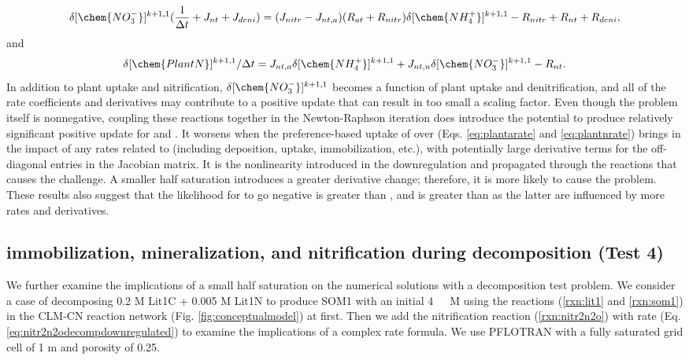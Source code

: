 \documentclass[gmd, manuscript]{copernicus}
\begin{document}
\begin{equation}
\delta [\chem{NO_3^-}]^{k+1,1} (\frac{1}{\Delta t} + J_{nt} + J_{deni}) =
(J_{nitr} - J_{nt,a})(R_{at} + R_{nitr}) \delta [\chem{NH_4^+}]^{k+1,1} -
R_{nitr} + R_{nt} + R_{deni},
\end{equation}
and
\begin{equation}
\delta [\chem{PlantN}]^{k+1,1}/\Delta t  = J_{nt,a} \delta
[\chem{NH_4^+}]^{k+1,1} + J_{nt,n} \delta [\chem{NO_3^-}]^{k+1,1} - R_{nt}. 
\end{equation}
In addition to plant  uptake and nitrification, $\delta
[\chem{NO_3^-}]^{k+1,1}$ becomes a function of plant  uptake and
denitrification, and all of the rate coefficients and derivatives may
contribute to a positive update that can result in too small a scaling factor.
Even though the problem itself is nonnegative, coupling these reactions
together in the Newton-Raphson iteration does introduce the potential to
produce relatively significant positive update for  and
. It worsens when the preference-based uptake of 
over  (Eqs. \ref{eq:plantarate} and \ref{eq:plantnrate}) brings
in the impact of any rates related to 
(including deposition, uptake, immobilization, etc.), with potentially large
derivative terms for the off-diagonal entries in the Jacobian matrix. It is the
nonlinearity introduced in the downregulation and propagated through the
reactions that causes the challenge. A smaller half saturation introduces a
greater derivative change; therefore, it is more likely to cause the problem.
These results also suggest that the likelihood for  to go negative
is greater than , and  is greater than  as
the latter are influenced by more rates and derivatives. 

\subsection{ immobilization, mineralization, and nitrification during decomposition (Test 4)}
We further examine the implications of a small half saturation on the numerical
solutions with a decomposition test problem. We consider a case of decomposing
0.2 M Lit1C + 0.005 M Lit1N to produce SOM1 with an initial 4 \unit{\mu\,M} 
using the reactions (\ref{rxn:lit1} and \ref{rxn:som1}) in the CLM-CN
reaction network (Fig. \ref{fig:conceptualmodel}) at first. Then we add the
nitrification reaction (\ref{rxn:nitr2n2o}) with rate
(Eq. \ref{eq:nitr2n2odecompdownregulated}) to examine the implications of a complex
rate formula. We use PFLOTRAN with a fully saturated grid cell of 1 m and
porosity of 0.25. 
\end{document}
